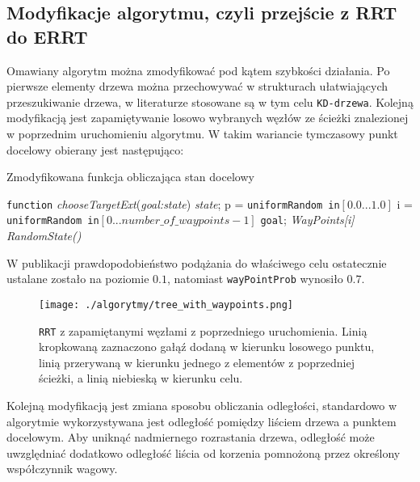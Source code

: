 \subsection{Modyfikacje algorytmu, czyli przejście z RRT do ERRT \label{sec:RRT:extend} }
Omawiany algorytm można zmodyfikować pod kątem szybkości działania. Po pierwsze elementy drzewa można przechowywać w strukturach ułatwiających przeszukiwanie drzewa,
w literaturze stosowane są w tym celu \texttt{KD-drzewa}. Kolejną modyfikacją jest zapamiętywanie losowo wybranych węzłów ze ścieżki znalezionej w poprzednim uruchomieniu
algorytmu. W takim wariancie tymczasowy punkt docelowy obierany jest następująco:
 \begin{algorithm}[H]
	\caption{ Zmodyfikowana funkcja obliczająca stan docelowy }
	\label{alg:chooseTargetExt}
	\begin{algorithmic}
	\STATE \texttt{function} \textit{chooseTargetExt}(\textit{goal:state}) \textit{state};
	\STATE p = \texttt{uniformRandom in}$[0.0 ...1.0]$
	\STATE i = \texttt{uniformRandom in}$[0 ...number\_of\_waypoints -1]$
	  \RETURN  \texttt{goal};
	  \RETURN \textit{WayPoints[i]}
	  \RETURN \textit{RandomState()}
	\ENDIF
	\end{algorithmic}
  \end{algorithm}
W publikacji \cite{RRT} prawdopodobieństwo podążania do właściwego celu ostatecznie ustalane zostało na poziomie $0.1$, natomiast \texttt{wayPointProb} wynosiło $0.7$.
\begin{figure}[h]
\centering
\texttt{[image: ./algorytmy/tree\_with\_waypoints.png]}
\caption{ \texttt{RRT} z zapamiętanymi węzłami z poprzedniego uruchomienia. Linią kropkowaną zaznaczono gałąź dodaną w kierunku losowego punktu,
 linią przerywaną w kierunku jednego z elementów z poprzedniej ścieżki, a linią niebieską w kierunku celu.} \label{fig:tree_with_waypoints}
\end{figure} 
Kolejną modyfikacją jest zmiana sposobu obliczania odległości, standardowo w algorytmie wykorzystywana jest odległość pomiędzy liściem drzewa a punktem docelowym. Aby uniknąć
nadmiernego rozrastania drzewa, odległość może uwzględniać dodatkowo odległość liścia od korzenia pomnożoną przez określony współczynnik wagowy.

